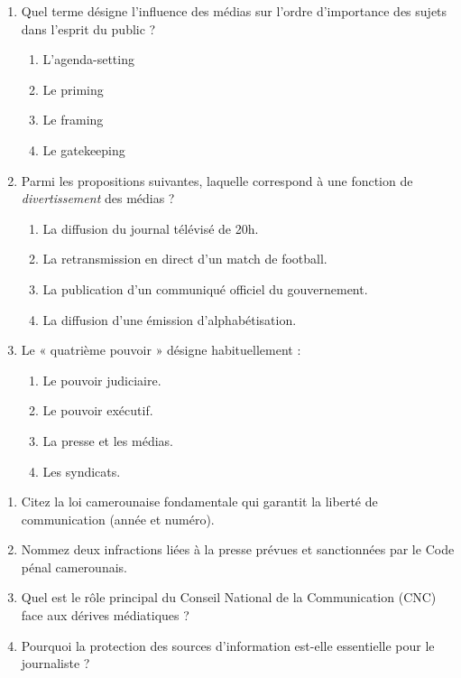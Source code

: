 \documentclass[11pt]{article}
\begin{document}
\begin{exercice}
\begin{enumerate}
    \item Quel terme désigne l'influence des médias sur l'ordre d'importance des sujets dans l'esprit du public ?
    \begin{enumerate}
        \item L'agenda-setting
        \item Le priming
        \item Le framing
        \item Le gatekeeping
    \end{enumerate}
    \item Parmi les propositions suivantes, laquelle correspond à une fonction de \textit{divertissement} des médias ?
    \begin{enumerate}
        \item La diffusion du journal télévisé de 20h.
        \item La retransmission en direct d'un match de football.
        \item La publication d'un communiqué officiel du gouvernement.
        \item La diffusion d'une émission d'alphabétisation.
    \end{enumerate}
    \item Le « quatrième pouvoir » désigne habituellement :
    \begin{enumerate}
        \item Le pouvoir judiciaire.
        \item Le pouvoir exécutif.
        \item La presse et les médias.
        \item Les syndicats.
    \end{enumerate}
\end{enumerate}
\end{exercice}

\begin{exercice}
\begin{enumerate}
    \item Citez la loi camerounaise fondamentale qui garantit la liberté de communication (année et numéro).
    \item Nommez deux infractions liées à la presse prévues et sanctionnées par le Code pénal camerounais.
    \item Quel est le rôle principal du Conseil National de la Communication (CNC) face aux dérives médiatiques ?
    \item Pourquoi la protection des sources d'information est-elle essentielle pour le journaliste ?
\end{enumerate}
\end{exercice}
\end{document}
